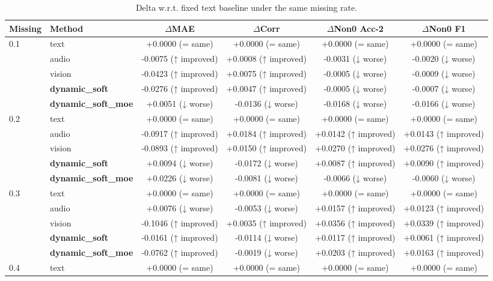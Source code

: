 \begin{table}[t]
\centering
\small
\caption{Delta w.r.t. fixed text baseline under the same missing rate.}
\label{tab:delta_vs_text}
\begin{tabular}{llcccc}
\toprule
Missing & Method & $\Delta$MAE & $\Delta$Corr & $\Delta$Non0 Acc-2 & $\Delta$Non0 F1 \\
\midrule
0.1 & text & +0.0000 (= same) & +0.0000 (= same) & +0.0000 (= same) & +0.0000 (= same) \\
 & audio & -0.0075 (↑ improved) & +0.0008 (↑ improved) & -0.0031 (↓ worse) & -0.0020 (↓ worse) \\
 & vision & -0.0423 (↑ improved) & +0.0075 (↑ improved) & -0.0005 (↓ worse) & -0.0009 (↓ worse) \\
 & \textbf{dynamic_soft} & -0.0276 (↑ improved) & +0.0047 (↑ improved) & -0.0005 (↓ worse) & -0.0007 (↓ worse) \\
 & \textbf{dynamic_soft_moe} & +0.0051 (↓ worse) & -0.0136 (↓ worse) & -0.0168 (↓ worse) & -0.0166 (↓ worse) \\
\midrule
0.2 & text & +0.0000 (= same) & +0.0000 (= same) & +0.0000 (= same) & +0.0000 (= same) \\
 & audio & -0.0917 (↑ improved) & +0.0184 (↑ improved) & +0.0142 (↑ improved) & +0.0143 (↑ improved) \\
 & vision & -0.0893 (↑ improved) & +0.0150 (↑ improved) & +0.0270 (↑ improved) & +0.0276 (↑ improved) \\
 & \textbf{dynamic_soft} & +0.0094 (↓ worse) & -0.0172 (↓ worse) & +0.0087 (↑ improved) & +0.0090 (↑ improved) \\
 & \textbf{dynamic_soft_moe} & +0.0226 (↓ worse) & -0.0081 (↓ worse) & -0.0066 (↓ worse) & -0.0060 (↓ worse) \\
\midrule
0.3 & text & +0.0000 (= same) & +0.0000 (= same) & +0.0000 (= same) & +0.0000 (= same) \\
 & audio & +0.0076 (↓ worse) & -0.0053 (↓ worse) & +0.0157 (↑ improved) & +0.0123 (↑ improved) \\
 & vision & -0.1046 (↑ improved) & +0.0035 (↑ improved) & +0.0356 (↑ improved) & +0.0339 (↑ improved) \\
 & \textbf{dynamic_soft} & -0.0161 (↑ improved) & -0.0114 (↓ worse) & +0.0117 (↑ improved) & +0.0061 (↑ improved) \\
 & \textbf{dynamic_soft_moe} & -0.0762 (↑ improved) & -0.0019 (↓ worse) & +0.0203 (↑ improved) & +0.0163 (↑ improved) \\
\midrule
0.4 & text & +0.0000 (= same) & +0.0000 (= same) & +0.0000 (= same) & +0.0000 (= same) \\

\end{tabular}
\end{table}
